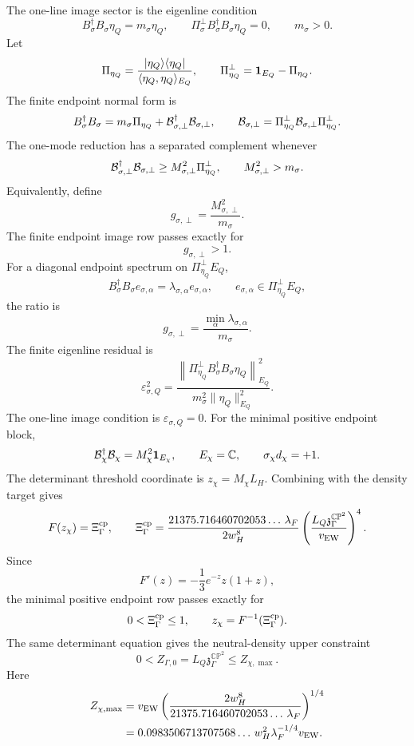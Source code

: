\documentclass[11pt]{article}
\theoremstyle{definition}
\theoremstyle{remark}
\newcommand{\CP}{\mathbb{CP}}
\begin{document}
The one-line image sector is the eigenline condition
\[
  B_\sigma^\dagger B_\sigma\eta_Q=m_\sigma\eta_Q,
  \qquad
  \Pi_\sigma^\perp B_\sigma^\dagger B_\sigma\eta_Q=0,
  \qquad
  m_\sigma>0 .
\]
Let
\[
  \Pi_{\eta_Q}
  =
  \frac{|\eta_Q\rangle\langle\eta_Q|}
  {\langle\eta_Q,\eta_Q\rangle_{E_Q}},
  \qquad
  \Pi_{\eta_Q}^\perp={\bf 1}_{E_Q}-\Pi_{\eta_Q}.
\]
The finite endpoint normal form is
\[
  B_\sigma^\dagger B_\sigma
  =
  m_\sigma\Pi_{\eta_Q}
  +
  {\cal B}_{\sigma,\perp}^\dagger{\cal B}_{\sigma,\perp},
  \qquad
  {\cal B}_{\sigma,\perp}
  =
  \Pi_{\eta_Q}^\perp{\cal B}_{\sigma,\perp}\Pi_{\eta_Q}^\perp .
\]
The one-mode reduction has a separated complement whenever
\[
  {\cal B}_{\sigma,\perp}^\dagger{\cal B}_{\sigma,\perp}
  \ge
  M_{\sigma,\perp}^2\Pi_{\eta_Q}^\perp,
  \qquad
  M_{\sigma,\perp}^2>m_\sigma .
\]
Equivalently, define
\[
  g_{\sigma,\perp}
  =
  \frac{M_{\sigma,\perp}^2}{m_\sigma}.
\]
The finite endpoint image row passes exactly for
\[
  g_{\sigma,\perp}>1 .
  \tag{5.3}
\]
For a diagonal endpoint spectrum on \(\Pi_{\eta_Q}^\perp E_Q\),
\[
  B_\sigma^\dagger B_\sigma e_{\sigma,\alpha}
  =
  \lambda_{\sigma,\alpha}e_{\sigma,\alpha},
  \qquad
  e_{\sigma,\alpha}\in\Pi_{\eta_Q}^\perp E_Q,
\]
the ratio is
\[
  g_{\sigma,\perp}
  =
  \frac{\min_\alpha\lambda_{\sigma,\alpha}}{m_\sigma}.
  \tag{5.4}
\]
The finite eigenline residual is
\[
  \varepsilon_{\sigma,Q}^2
  =
  \frac{
  \left\|
  \Pi_{\eta_Q}^\perp B_\sigma^\dagger B_\sigma\eta_Q
  \right\|_{E_Q}^2}
  {m_\sigma^2\|\eta_Q\|_{E_Q}^2}.
\]
The one-line image condition is \(\varepsilon_{\sigma,Q}=0\).
For the minimal positive endpoint block,
\[
  {\cal B}_\chi^\dagger{\cal B}_\chi
  =
  M_\chi^2{\bf 1}_{E_\chi},
  \qquad
  E_\chi=\mathbb C,
  \qquad
  \sigma_\chi d_\chi=+1 .
\]
The determinant threshold coordinate is \(z_\chi=M_\chi L_H\).  Combining
with the density target gives
\[
  F(z_\chi)
  =
  \Xi_\Gamma^{\rm cp},
  \qquad
  \Xi_\Gamma^{\rm cp}
  =
  \frac{21375.716460702053\ldots\,\lambda_F}{2w_H^8}
  \left(
  \frac{L_Q{\mathfrak z}_{\Gamma}^{\CP^2}}{v_{\rm EW}}
  \right)^4 .
\]
Since
\[
  F'(z)=-\frac13e^{-z}z(1+z),
\]
the minimal positive endpoint row passes exactly for
\[
  0<\Xi_\Gamma^{\rm cp}\le1,
  \qquad
  z_\chi=F^{-1}(\Xi_\Gamma^{\rm cp}).
\]
The same determinant equation gives the neutral-density upper constraint
\[
  0<Z_{\Gamma,0}
  =
  L_Q{\mathfrak z}_{\Gamma}^{\CP^2}
  \le
  Z_{\chi,\max}.
\]
Here
\[
  \begin{aligned}
  Z_{\chi,\max}
  &=
  v_{\rm EW}
  \left(
  \frac{2w_H^8}{21375.716460702053\ldots\,\lambda_F}
  \right)^{1/4}  \\
  &=
  0.0983506713707568\ldots\,
  w_H^2\lambda_F^{-1/4}v_{\rm EW}.
  \end{aligned}
\]
\end{document}
